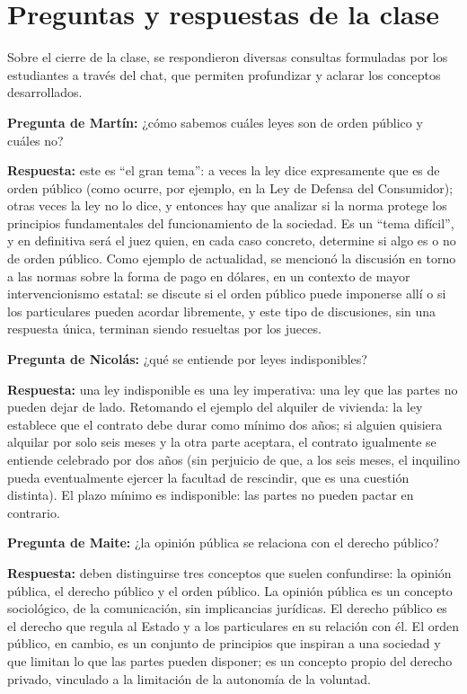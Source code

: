 \documentclass[12pt,oneside]{book}
\begin{document}
\chapter{Preguntas y respuestas de la clase}

Sobre el cierre de la clase, se respondieron diversas consultas formuladas por los estudiantes a través del chat, que permiten profundizar y aclarar los conceptos desarrollados.

\begin{note}
\textbf{Pregunta de Martín:} ¿cómo sabemos cuáles leyes son de orden público y cuáles no?

\textbf{Respuesta:} este es ``el gran tema'': a veces la ley dice expresamente que es de orden público (como ocurre, por ejemplo, en la Ley de Defensa del Consumidor); otras veces la ley no lo dice, y entonces hay que analizar si la norma protege los principios fundamentales del funcionamiento de la sociedad. Es un ``tema difícil'', y en definitiva será el juez quien, en cada caso concreto, determine si algo es o no de orden público. Como ejemplo de actualidad, se mencionó la discusión en torno a las normas sobre la forma de pago en dólares, en un contexto de mayor intervencionismo estatal: se discute si el orden público puede imponerse allí o si los particulares pueden acordar libremente, y este tipo de discusiones, sin una respuesta única, terminan siendo resueltas por los jueces.
\end{note}

\begin{note}
\textbf{Pregunta de Nicolás:} ¿qué se entiende por leyes indisponibles?

\textbf{Respuesta:} una ley indisponible es una ley imperativa: una ley que las partes no pueden dejar de lado. Retomando el ejemplo del alquiler de vivienda: la ley establece que el contrato debe durar como mínimo dos años; si alguien quisiera alquilar por solo seis meses y la otra parte aceptara, el contrato igualmente se entiende celebrado por dos años (sin perjuicio de que, a los seis meses, el inquilino pueda eventualmente ejercer la facultad de rescindir, que es una cuestión distinta). El plazo mínimo es indisponible: las partes no pueden pactar en contrario.
\end{note}

\begin{note}
\textbf{Pregunta de Maite:} ¿la opinión pública se relaciona con el derecho público?

\textbf{Respuesta:} deben distinguirse tres conceptos que suelen confundirse: la opinión pública, el derecho público y el orden público. La opinión pública es un concepto sociológico, de la comunicación, sin implicancias jurídicas. El derecho público es el derecho que regula al Estado y a los particulares en su relación con él. El orden público, en cambio, es un conjunto de principios que inspiran a una sociedad y que limitan lo que las partes pueden disponer; es un concepto propio del derecho privado, vinculado a la limitación de la autonomía de la voluntad.
\end{note}
\end{document}
